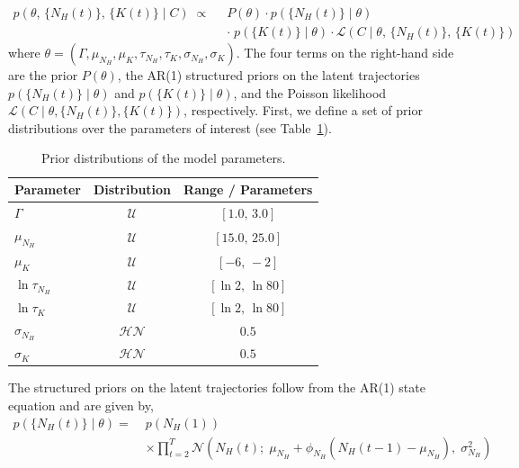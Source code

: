 \documentclass{aa}
\begin{document}
\begin{equation}
\begin{split}
p\!\left(\theta,\, \{N_H(t)\},\, \{K(t)\} \mid C\right)
\;\propto\;\;
& P(\theta)\cdot
p\!\left(\{N_H(t)\} \mid \theta\right) \\
&\cdot\;
p\!\left(\{K(t)\} \mid \theta\right)\cdot
\mathcal{L}\!\left(C \mid \theta,\,\{N_H(t)\},\,\{K(t)\}\right)
\end{split}
\label{eq:bayes}
\end{equation}
where $\theta = (\Gamma, \mu_{N_H}, \mu_K, \tau_{N_H},  \tau_K, \sigma_{N_H}, \sigma_K)$. The four terms on the right-hand side are the prior $P(\theta)$, the AR(1) structured priors on the latent trajectories $p(\{N_H(t)\} \mid \theta)$ and $p(\{K(t)\} \mid \theta)$, and the Poisson likelihood $\mathcal{L}(C \mid \theta, \{N_H(t)\}, \{K(t)\})$, respectively. First, we define a set of prior distributions over the parameters of interest (see Table~\ref{tab:priors}). \\

\begin{table}
\caption{Prior distributions of the model parameters.}
\label{tab:priors}
\centering
\begin{tabular}{lcc}
\hline\hline
Parameter & Distribution & Range / Parameters \\
\hline
$\Gamma$ & $\mathcal{U}$ & $[1.0,\,3.0]$ \\
$\mu_{N_H}$ & $\mathcal{U}$ & $[15.0,\,25.0]$ \\
$\mu_{K}$ & $\mathcal{U}$ & $[-6,\,-2]$ \\
$\ln \tau_{N_H}$ & $\mathcal{U}$ & $[\ln 2,\,\ln 80]$ \\
$\ln \tau_{K}$ & $\mathcal{U}$ & $[\ln 2,\,\ln 80]$ \\
$\sigma_{N_H}$ & $\mathcal{HN}$ & $0.5$ \\
$\sigma_{K}$ & $\mathcal{HN}$ & $0.5$ \\
\hline
\end{tabular}
\end{table}
The structured priors on the latent trajectories follow from the AR(1) state equation and are given by,
\begin{equation}
\begin{split}
p\!\left(\{N_H(t)\} \mid \theta\right)
= \;& p\!\left(N_H(1)\right) \\
&\times \prod_{t=2}^{T}
\mathcal{N}\!\left(N_H(t);\;
\mu_{N_H} + \phi_{N_H}\!\left(N_H(t-1)
- \mu_{N_H}\right),\;
\sigma_{N_H}^2\right)
\end{split}
\label{eq:ar1_prior_nh}
\end{equation}
\end{document}
